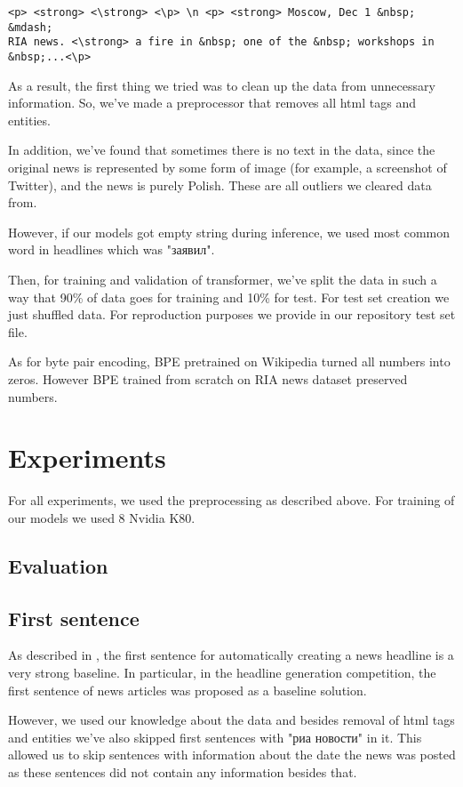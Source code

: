 \documentclass{dialogue}
\begin{document}
\begin{verbatim}
<p> <strong> <\strong> <\p> \n <p> <strong> Moscow, Dec 1 &nbsp; &mdash;
RIA news. <\strong> a fire in &nbsp; one of the &nbsp; workshops in
&nbsp;...<\p>
\end{verbatim}

As a result, the first thing we tried was to clean up the data from unnecessary information. So, we've made a preprocessor that removes all html tags and entities.

In addition, we've found that sometimes there is no text in the data, since the original news is represented by some form of image (for example, a screenshot of Twitter), and the news is purely Polish. These are all outliers we cleared data from.

However, if our models got empty string during inference, we used most common word in headlines which was "заявил".

Then, for training and validation of transformer, we've split the data in such a way that 90\% of data goes for training and 10\% for test. For test set creation we just shuffled data. For reproduction purposes we provide in our repository test set file.

As for byte pair encoding, BPE pretrained on Wikipedia turned all numbers into zeros. However BPE trained from scratch on RIA news dataset preserved numbers.

\section{Experiments}
For all experiments, we used the preprocessing as described above. For training of our models we used 8 Nvidia K80.

\subsection{Evaluation}


\subsection{First sentence}

As described in \cite{Putra2018IncorporatingTS}, the first sentence for automatically creating a news headline is a very strong baseline. In particular, in the headline generation competition, the first sentence of news articles was proposed as a baseline solution.

However, we used our knowledge about the data and besides removal of html tags and entities we've also skipped first sentences with "риа новости" in it. This allowed us to skip sentences with information about the date the news was posted as these sentences did not contain any information besides that.
\end{document}
